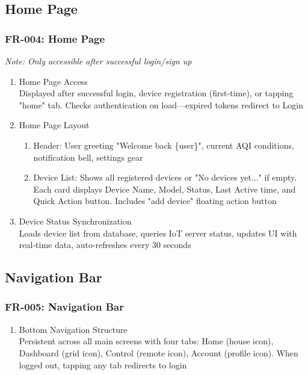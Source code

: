 \documentclass[conference]{IEEEtran}
\begin{document}
\subsection{\textbf{Home Page}}

\subsubsection{FR-004: Home Page}

\textit{Note: Only accessible after successful login/sign up}

\begin{enumerate}
\item Home Page Access\\
Displayed after successful login, device registration (first-time), or tapping "home" tab. Checks authentication on load—expired tokens redirect to Login

\item Home Page Layout
    \begin{enumerate}
    \item Header: User greeting "Welcome back \{user\}", current AQI conditions, notification bell, settings gear
    \item Device List: Shows all registered devices or "No devices yet..." if empty. Each card displays Device Name, Model, Status, Last Active time, and Quick Action button. Includes "add device" floating action button
    \end{enumerate}

\item Device Status Synchronization\\
Loads device list from database, queries IoT server status, updates UI with real-time data, auto-refreshes every 30 seconds
\end{enumerate}

\subsection{\textbf{Navigation Bar}}

\subsubsection{FR-005: Navigation Bar}

\begin{enumerate}
\item Bottom Navigation Structure\\
Persistent across all main screens with four tabs: Home (house icon), Dashboard (grid icon), Control (remote icon), Account (profile icon). When logged out, tapping any tab redirects to login
\end{enumerate}
\end{document}
